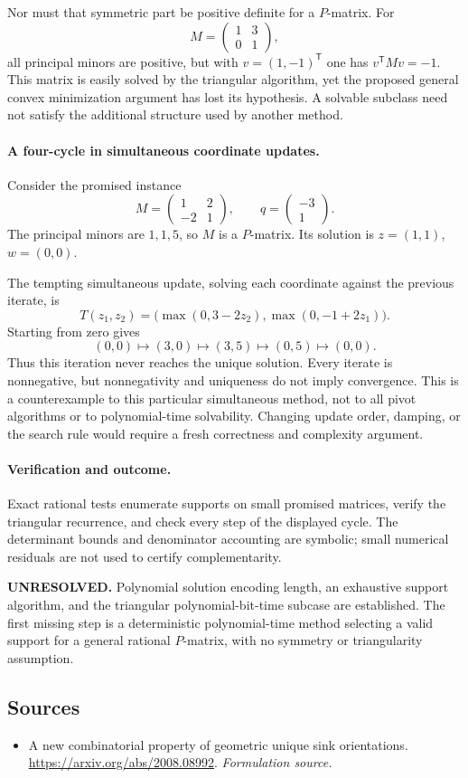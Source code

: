 \documentclass[11pt]{article}
\begin{document}
Nor must that symmetric part be positive definite for a $P$-matrix. For
\[
 M=\begin{pmatrix}1&3\\0&1\end{pmatrix},
\]
all principal minors are positive, but with $v=(1,-1)^{\mathsf T}$ one has $v^{\mathsf T}Mv=-1$. This matrix is easily solved by the triangular algorithm, yet the proposed general convex minimization argument has lost its hypothesis. A solvable subclass need not satisfy the additional structure used by another method.

\paragraph{A four-cycle in simultaneous coordinate updates.}
Consider the promised instance
\[
 M=\begin{pmatrix}1&2\\-2&1\end{pmatrix},
 \qquad q=\begin{pmatrix}-3\\1\end{pmatrix}.
\]
The principal minors are $1,1,5$, so $M$ is a $P$-matrix. Its solution is $z=(1,1)$, $w=(0,0)$.

The tempting simultaneous update, solving each coordinate against the previous iterate, is
\[
 T(z_1,z_2)=\bigl(\max(0,3-2z_2),\max(0,-1+2z_1)\bigr).
\]
Starting from zero gives
\[
 (0,0)\mapsto(3,0)\mapsto(3,5)\mapsto(0,5)\mapsto(0,0).
\]
Thus this iteration never reaches the unique solution. Every iterate is nonnegative, but nonnegativity and uniqueness do not imply convergence. This is a counterexample to this particular simultaneous method, not to all pivot algorithms or to polynomial-time solvability. Changing update order, damping, or the search rule would require a fresh correctness and complexity argument.

\paragraph{Verification and outcome.}
Exact rational tests enumerate supports on small promised matrices, verify the triangular recurrence, and check every step of the displayed cycle. The determinant bounds and denominator accounting are symbolic; small numerical residuals are not used to certify complementarity.

\textbf{UNRESOLVED.} Polynomial solution encoding length, an exhaustive support algorithm, and the triangular polynomial-bit-time subcase are established. The first missing step is a deterministic polynomial-time method selecting a valid support for a general rational $P$-matrix, with no symmetry or triangularity assumption.

\subsection{Sources}
\begin{itemize}
\item[S1]A new combinatorial property of geometric unique sink orientations.
\url{https://arxiv.org/abs/2008.08992}.
\textit{Formulation source.}
\end{itemize}
\end{document}
